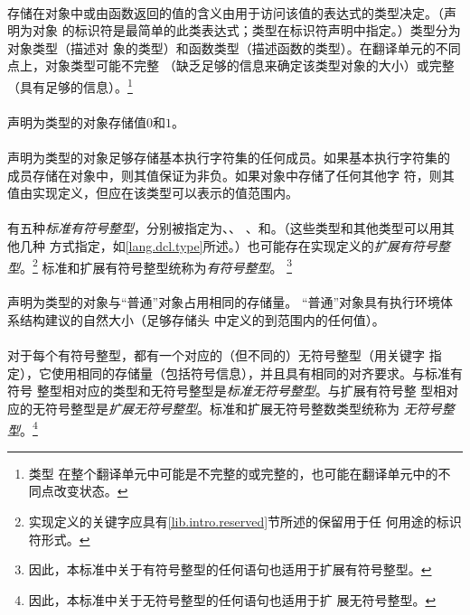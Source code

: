 \paragraph{}
存储在对象中或由函数返回的值的含义由用于访问该值的表达式的类型决定。（声明为对象
的标识符是最简单的此类表达式；类型在标识符声明中指定。）类型分为对象类型（描述对
象的类型）和函数类型（描述函数的类型）。在翻译单元的不同点上，对象类型可能不完整
（缺乏足够的信息来确定该类型对象的大小）或完整（具有足够的信息）。\footnote{类型
在整个翻译单元中可能是不完整的或完整的，也可能在翻译单元中的不同点改变状态。}

\paragraph{}
声明为类型的对象存储值$0$和$1$。

\paragraph{}
声明为类型的对象足够存储基本执行字符集的任何成员。如果基本执行字符集的
成员存储在对象中，则其值保证为非负。如果对象中存储了任何其他字
符，则其值由实现定义，但应在该类型可以表示的值范围内。

\paragraph{}
有五种\textit{标准有符号整型}，分别被指定为、、
、和。（这些类型和其他类型可以用其他几种
方式指定，如\ref{lang.dcl.type}所述。）也可能存在实现定义的\textit{扩展有符号整
型}。\footnote{实现定义的关键字应具有\ref{lib.intro.reserved}节所述的保留用于任
何用途的标识符形式。} 标准和扩展有符号整型统称为\textit{有符号整型}。
\footnote{因此，本标准中关于有符号整型的任何语句也适用于扩展有符号整型。}

\paragraph{}
声明为类型的对象与``普通''对象占用相同的存储量。
``普通''对象具有执行环境体系结构建议的自然大小（足够存储头
中定义的到范围内的任何值）。

\paragraph{}
对于每个有符号整型，都有一个对应的（但不同的）无符号整型（用关键字
指定），它使用相同的存储量（包括符号信息），并且具有相同的对齐要求。与标准有符号
整型相对应的类型和无符号整型是\textit{标准无符号整型}。与扩展有符号整
型相对应的无符号整型是\textit{扩展无符号整型}。标准和扩展无符号整数类型统称为
\textit{无符号整型}。\footnote{因此，本标准中关于无符号整型的任何语句也适用于扩
展无符号整型。}

